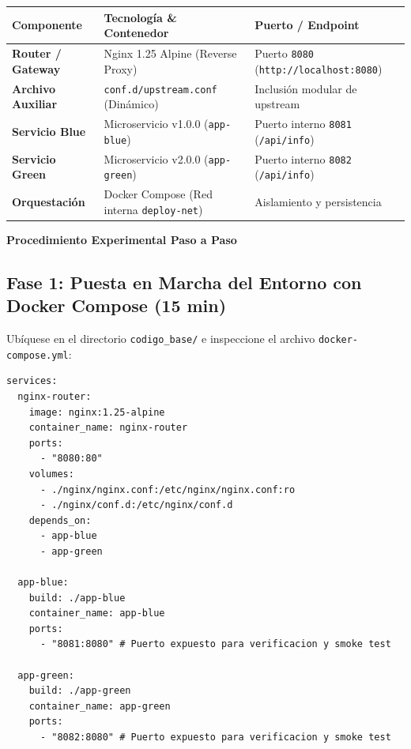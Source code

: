 \documentclass[10pt,letterpaper]{article}
\newcommand{\sectionBadge}[1]{%
  \refstepcounter{section}%
  \vspace{0.16cm}%
  \noindent%
  \colorbox{icesiBlue}{\color{white}\rule[-0.08cm]{0pt}{0.42cm}\hspace{0.16cm}\textbf{\normalsize \thesection}\hspace{0.16cm}}%
  \hspace{0.18cm}%
  {\fontsize{9.5}{12}\selectfont\textbf{\color{icesiDark}#1}}\\[-0.10cm]%
  \noindent{\color{icesiDark}\rule{\textwidth}{0.8pt}}\vspace{0.06cm}%
}
\begin{document}
\vspace{0.03cm}
\noindent
\fontsize{7.0}{8.8}\selectfont
\begin{tabularx}{\textwidth}{|L{2.8cm}|X|L{3.5cm}|}
\hline
{}
\textbf{Componente} & \textbf{Tecnología \& Contenedor} & \textbf{Puerto / Endpoint} \\ \hline
\textbf{Router / Gateway} & Nginx 1.25 Alpine (Reverse Proxy) & Puerto \texttt{8080} (\texttt{http://localhost:8080}) \\ \hline
\textbf{Archivo Auxiliar} & \texttt{conf.d/upstream.conf} (Dinámico) & Inclusión modular de upstream \\ \hline
\textbf{Servicio Blue} & Microservicio v1.0.0 (\texttt{app-blue}) & Puerto interno \texttt{8081} (\texttt{/api/info}) \\ \hline
\textbf{Servicio Green} & Microservicio v2.0.0 (\texttt{app-green}) & Puerto interno \texttt{8082} (\texttt{/api/info}) \\ \hline
\textbf{Orquestación} & Docker Compose (Red interna \texttt{deploy-net}) & Aislamiento y persistencia \\ \hline
\end{tabularx}

\newpage

\sectionBadge{Procedimiento Experimental Paso a Paso}

\subsection{Fase 1: Puesta en Marcha del Entorno con Docker Compose (15 min)}
Ubíquese en el directorio \texttt{codigo\_base/} e inspeccione el archivo \texttt{docker-compose.yml}:
\begin{lstlisting}[style=codeStyle]
services:
  nginx-router:
    image: nginx:1.25-alpine
    container_name: nginx-router
    ports:
      - "8080:80"
    volumes:
      - ./nginx/nginx.conf:/etc/nginx/nginx.conf:ro
      - ./nginx/conf.d:/etc/nginx/conf.d
    depends_on:
      - app-blue
      - app-green

  app-blue:
    build: ./app-blue
    container_name: app-blue
    ports:
      - "8081:8080" # Puerto expuesto para verificacion y smoke test

  app-green:
    build: ./app-green
    container_name: app-green
    ports:
      - "8082:8080" # Puerto expuesto para verificacion y smoke test
\end{lstlisting}
\end{document}
